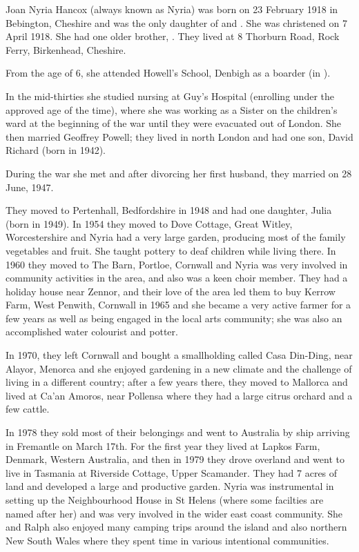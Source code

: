 
Joan Nyria Hancox (always known as Nyria) was born on 23 February 1918 in Bebington, Cheshire\cite{BMDIndex_JoanNyriaHancox_birth} and was the only daughter of  and .\cite{NyriaBirth} She was christened on 7 April 1918.\cite{NyriaChristening} She had one older brother, .
They lived at 8 Thorburn Road, Rock Ferry, Birkenhead, Cheshire.

From the age of 6, she attended Howell's School, Denbigh as a boarder (in ).\cite{OralHistoryJDB2008}

In the mid-thirties she studied nursing at Guy's Hospital (enrolling under the approved age of the time),  where she was working  as a Sister on the children's ward at the beginning of the war until they were evacuated out of London. She then married Geoffrey Powell; they lived in north London and had one son, David Richard (born in 1942).

During the war she met  and after divorcing her first husband, they married on 28 June, 1947.\cite{MarriageCertRalphDentonBarkerJoanNyriaPowell}

They moved to Pertenhall, Bedfordshire in 1948 and had one daughter, Julia (born in 1949).  In 1954 they moved to Dove Cottage, Great Witley, Worcestershire and Nyria had a very large garden, producing most of the family vegetables and fruit. She taught pottery to deaf children while living there.  In 1960 they moved to The Barn, Portloe, Cornwall and Nyria was very involved in community activities in the area, and also was a keen choir member.  They had a holiday house near Zennor, and their love of the area led them to buy Kerrow Farm, West Penwith, Cornwall in 1965 and she became a very active farmer for a few years as well as being engaged in the local arts community; she was also an accomplished water colourist and potter.

In 1970, they left Cornwall and  bought a smallholding called Casa Din-Ding, near Alayor, Menorca and she enjoyed  gardening in  a new climate and the challenge of living in a different country;  after a few years there, they moved to Mallorca and lived at Ca'an Amoros, near Pollensa where they had a large citrus orchard and a few cattle.  

In 1978 they sold most of their belongings and went to Australia by ship arriving in Fremantle on March 17th.  For the first year they lived at Lapkos Farm, Denmark, Western Australia, and then in 1979 they drove overland and went to live in Tasmania at Riverside Cottage, Upper Scamander. They had 7 acres of land and developed a large and productive garden. Nyria was instrumental in setting up the Neighbourhood House in St Helens (where some facilties are named after her)  and was very involved in the wider east coast community.  She and Ralph also enjoyed many camping trips around the island and also northern New South Wales where they spent time in various intentional communities. 

